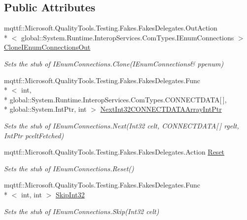 \subsection*{Public Attributes}
\begin{DoxyCompactItemize}
\item 
mqttf\-::\-Microsoft.\-Quality\-Tools.\-Testing.\-Fakes.\-Fakes\-Delegates.\-Out\-Action\\*
$<$ global\-::\-System.\-Runtime.\-Interop\-Services.\-Com\-Types.\-I\-Enum\-Connections $>$ \hyperlink{class_system_1_1_runtime_1_1_interop_services_1_1_com_types_1_1_fakes_1_1_stub_i_enum_connections_ad90a8adaa982383a5ab4f938f5f9c060}{Clone\-I\-Enum\-Connections\-Out}
\begin{DoxyCompactList}\small\item\em Sets the stub of I\-Enum\-Connections.\-Clone(I\-Enum\-Connections\& ppenum)\end{DoxyCompactList}\item 
mqttf\-::\-Microsoft.\-Quality\-Tools.\-Testing.\-Fakes.\-Fakes\-Delegates.\-Func\\*
$<$ int, \\*
global\-::\-System.\-Runtime.\-Interop\-Services.\-Com\-Types.\-C\-O\-N\-N\-E\-C\-T\-D\-A\-T\-A\mbox{[}$\,$\mbox{]}, \\*
global\-::\-System.\-Int\-Ptr, int $>$ \hyperlink{class_system_1_1_runtime_1_1_interop_services_1_1_com_types_1_1_fakes_1_1_stub_i_enum_connections_aaf081d9d9a93a282b1f223da3d278876}{Next\-Int32\-C\-O\-N\-N\-E\-C\-T\-D\-A\-T\-A\-Array\-Int\-Ptr}
\begin{DoxyCompactList}\small\item\em Sets the stub of I\-Enum\-Connections.\-Next(\-Int32 celt, C\-O\-N\-N\-E\-C\-T\-D\-A\-T\-A\mbox{[}$\,$\mbox{]} rgelt, Int\-Ptr pcelt\-Fetched)\end{DoxyCompactList}\item 
mqttf\-::\-Microsoft.\-Quality\-Tools.\-Testing.\-Fakes.\-Fakes\-Delegates.\-Action \hyperlink{class_system_1_1_runtime_1_1_interop_services_1_1_com_types_1_1_fakes_1_1_stub_i_enum_connections_a5905d654d6e3869d3ed2a309c814bcae}{Reset}
\begin{DoxyCompactList}\small\item\em Sets the stub of I\-Enum\-Connections.\-Reset()\end{DoxyCompactList}\item 
mqttf\-::\-Microsoft.\-Quality\-Tools.\-Testing.\-Fakes.\-Fakes\-Delegates.\-Func\\*
$<$ int, int $>$ \hyperlink{class_system_1_1_runtime_1_1_interop_services_1_1_com_types_1_1_fakes_1_1_stub_i_enum_connections_a2755f50a46419d2735387adb8f50441f}{Skip\-Int32}
\begin{DoxyCompactList}\small\item\em Sets the stub of I\-Enum\-Connections.\-Skip(\-Int32 celt)\end{DoxyCompactList}\end{DoxyCompactItemize}


